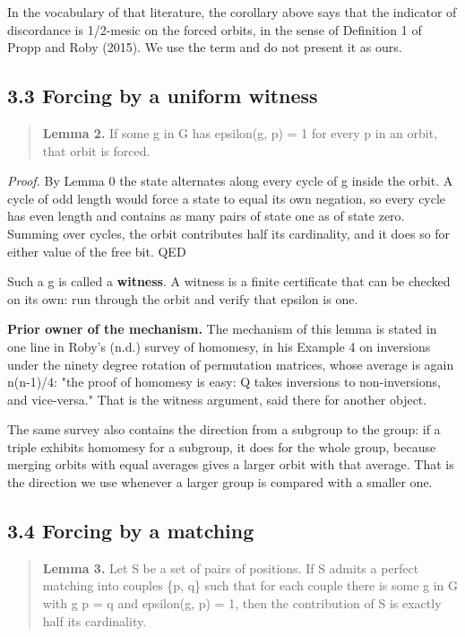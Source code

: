 \documentclass[11pt,a4paper]{article}
\begin{document}
In the vocabulary of that literature, the corollary above says that the indicator of discordance is 1/2-mesic on the forced orbits, in the sense of Definition 1 of Propp and Roby (2015). We use the term and do not present it as ours.

\subsection*{3.3 Forcing by a uniform witness}

\begin{quote}
\textbf{Lemma 2.} If some g in G has epsilon(g, p) = 1 for every p in an orbit, that orbit is forced.
\end{quote}

\emph{Proof.} By Lemma 0 the state alternates along every cycle of g inside the orbit. A cycle of odd length would force a state to equal its own negation, so every cycle has even length and contains as many pairs of state one as of state zero. Summing over cycles, the orbit contributes half its cardinality, and it does so for either value of the free bit. QED

Such a g is called a \textbf{witness}. A witness is a finite certificate that can be checked on its own: run through the orbit and verify that epsilon is one.

\textbf{Prior owner of the mechanism.} The mechanism of this lemma is stated in one line in Roby's (n.d.) survey of homomesy, in his Example 4 on inversions under the ninety degree rotation of permutation matrices, whose average is again n(n-1)/4: "the proof of homomesy is easy: Q takes inversions to non-inversions, and vice-versa." That is the witness argument, said there for another object.

The same survey also contains the direction from a subgroup to the group: if a triple exhibits homomesy for a subgroup, it does for the whole group, because merging orbits with equal averages gives a larger orbit with that average. That is the direction we use whenever a larger group is compared with a smaller one.

\subsection*{3.4 Forcing by a matching}

\begin{quote}
\textbf{Lemma 3.} Let S be a set of pairs of positions. If S admits a perfect matching into couples \{p, q\} such that for each couple there is some g in G with g p = q and epsilon(g, p) = 1, then the contribution of S is exactly half its cardinality.
\end{quote}
\end{document}
